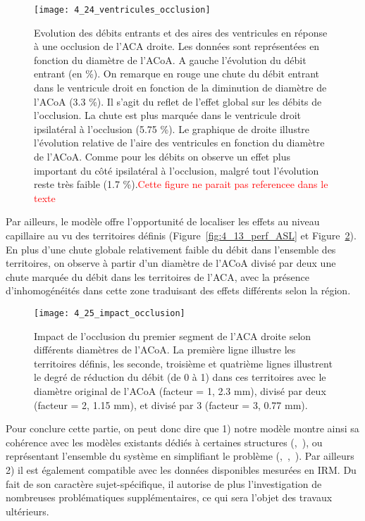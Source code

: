 \begin{figure}[!t]
\centering
\texttt{[image: 4\_24\_ventricules\_occlusion]}
\caption{ Evolution des débits entrants et des aires des ventricules en réponse à une occlusion de l'ACA droite. Les données
sont représentées en fonction du diamètre de l'ACoA. A gauche l’évolution du débit entrant (en \%). On remarque en rouge
une chute du débit entrant dans le ventricule droit en fonction de la diminution de diamètre de l’ACoA (3.3 \%). Il s’agit du
reflet de l’effet global sur les débits de l’occlusion. La chute est plus marquée dans le ventricule droit ipsilatéral à l’occlusion
(5.75 \%). Le graphique de droite illustre l’évolution relative de l’aire des ventricules en fonction du diamètre de l’ACoA.
Comme pour les débits on observe un effet plus important du côté ipsilatéral à l’occlusion, malgré tout l’évolution reste très
faible (1.7 \%).\textcolor{red} {Cette figure ne parait pas referencee dans le texte}}
\label{fig:4_24_occlusion_ventricule}	
\end{figure}
Par ailleurs, le modèle offre l’opportunité de localiser les effets au niveau capillaire au vu des
territoires définis (Figure~\ref{fig:4_13_perf_ASL} et Figure~\ref{fig:4_25_impact_occlusion}). En plus d’une chute globale relativement faible du débit
dans l’ensemble des territoires, on observe à partir d’un diamètre de l’ACoA divisé par deux une chute
marquée du débit dans les territoires de l’ACA, avec la présence d’inhomogénéités dans cette zone
traduisant des effets différents selon la région.\\
\begin{figure}[!t]
\centering
\texttt{[image: 4\_25\_impact\_occlusion]}
\caption{ Impact de l'occlusion du premier segment de l'ACA droite selon différents diamètres de l'ACoA. La première ligne
illustre les territoires définis, les seconde, troisième et quatrième lignes illustrent le degré de réduction du débit (de 0 à 1)
dans ces territoires avec le diamètre original de l’ACoA (facteur = 1, 2.3 mm), divisé par deux (facteur = 2, 1.15 mm), et divisé
par 3 (facteur = 3, 0.77 mm).}
\label{fig:4_25_impact_occlusion}	
\end{figure}
Pour conclure cette partie, on peut donc dire que 1) notre modèle montre ainsi sa cohérence
avec les modèles existants dédiés à certaines structures (\cite{Cebral2003},~\cite{Cassot1995}), ou représentant l’ensemble du
système en simplifiant le problème (\cite{Zagzoule1986},~\cite{Linninger2009},~\cite{Kim2007}). Par ailleurs 2) il est également compatible avec les
données disponibles mesurées en IRM. Du fait de son caractère sujet-spécifique, il autorise de plus
l’investigation de nombreuses problématiques supplémentaires, ce qui sera l’objet des travaux
ultérieurs.


{}
